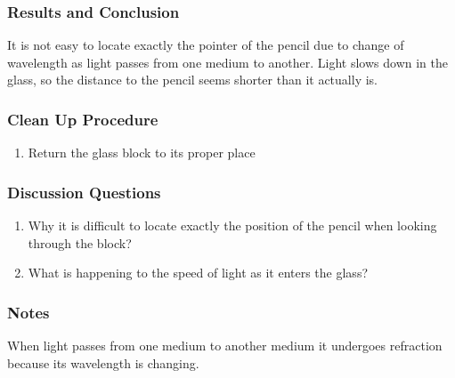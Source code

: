 \subsubsection*{Results and Conclusion}
It is not easy to locate exactly the pointer of the pencil due to change of wavelength as light passes from one medium to another. Light slows down in the glass, so the distance to the pencil seems shorter than it actually is.  

\subsubsection*{Clean Up Procedure}
\begin{enumerate}
\item{Return the glass block to its proper place}
\end{enumerate}

\subsubsection*{Discussion Questions}
\begin{enumerate}
\item{Why it is difficult to locate exactly the position of the pencil when looking through the block?}
\item{What is happening to the speed of light as it enters the glass?}
\end{enumerate}

\subsubsection*{Notes}
When light passes from one medium to another medium it undergoes refraction because its wavelength is changing.
